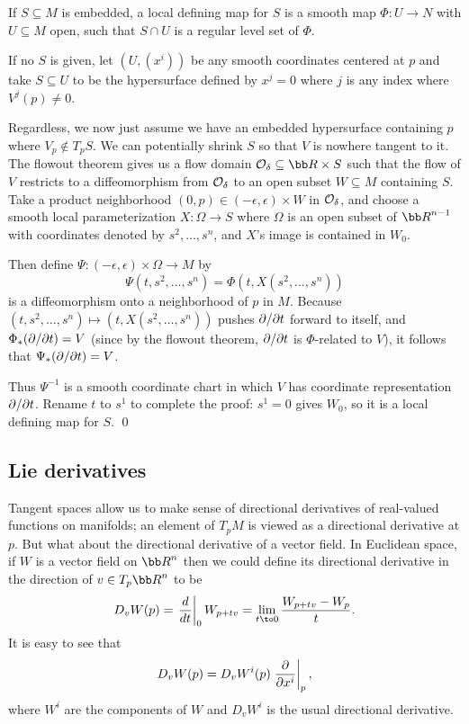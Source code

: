     If $S\subseteq M$ is embedded, a {\emphcolor local defining map} for $S$ is a smooth map $\Phi\colon U\to N$ with $U\subseteq M$ open, such that
    $S\cap U$ is a regular level set of $\Phi$.

\enote

\bproof

    If no $S$ is given, let $(U,(x^i))$ be any smooth coordinates centered at $p$ and take $S\subseteq U$ to be the hypersurface defined by $x^j=0$
    where $j$ is any index where $V^j(p)\neq0$.

    Regardless, we now just assume we have an embedded hypersurface containing $p$ where $V_p\notin T_pS$.
    We can potentially shrink $S$ so that $V$ is nowhere tangent to it.
    The flowout theorem gives us a flow domain $\O_\delta\subseteq\bR\times S$ such that the flow of $V$ restricts to a diffeomorphism from ${{\cal O}}_\delta$
    to an open subset $W\subseteq M$ containing $S$.
    Take a product neighborhood $(0,p)\in(-\epsilon,\epsilon)\times W$ in ${{\cal O}}_\delta$, and choose a smooth local parameterization $X\colon\Omega\to S$
    where $\Omega$ is an open subset of $\bR^{n-1}$ with coordinates denoted by $s^2,\dots,s^n$, and $X$'s image is contained in $W_0$.

    Then define $\Psi\colon(-\epsilon,\epsilon)\times\Omega\to M$ by
    $$ \Psi(t,s^2,\dots,s^n) = \Phi(t,X(s^2,\dots,s^n)) $$
    is a diffeomorphism onto a neighborhood of $p$ in $M$.
    Because $(t,s^2,\dots,s^n)\mapsto(t,X(s^2,\dots,s^n))$ pushes $\partial /\partial t$ forward to itself, and $\Phi_*(\partial /\partial t)=V$ (since by the flowout theorem,
    $\partial /\partial t$ is $\Phi$-related to $V$), it follows that $\Psi_*(\partial /\partial t)=V$.

    Thus $\Psi^{-1}$ is a smooth coordinate chart in which $V$ has coordinate representation $\partial /\partial t$.
    Rename $t$ to $s^1$ to complete the proof: $s^1=0$ gives $W_0$, so it is a local defining map for $S$.
    \qed

\eproof

\subsection{Lie derivatives}

Tangent spaces allow us to make sense of directional derivatives of real-valued functions on manifolds; an element of $T_pM$ is viewed as a directional
derivative at $p$.
But what about the directional derivative of a vector field.
In Euclidean space, if $W$ is a vector field on $\bR^n$ then we could define its directional derivative in the direction of $v\in T_p\bR^n$ to be
$$ D_vW(p) = \evdrv t_0 W_{p+tv} = \lim_{t\to0}\frac{W_{p+tv}-W_p}t . $$
It is easy to see that
$$ D_vW(p) = D_vW^i(p)\left.{{\partial }\over{\partial x^i}}\right|_p , $$
where $W^i$ are the components of $W$ and $D_vW^i$ is the usual directional derivative.

